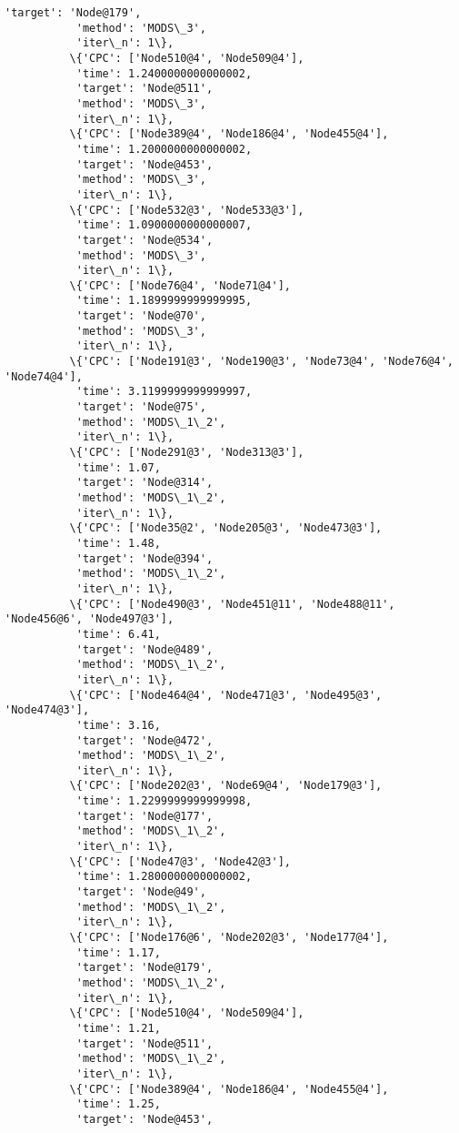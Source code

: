 \documentclass[11pt]{article}
\begin{document}
\begin{Verbatim}[commandchars=\\\{\}]
           'target': 'Node@179',
           'method': 'MODS\_3',
           'iter\_n': 1\},
          \{'CPC': ['Node510@4', 'Node509@4'],
           'time': 1.2400000000000002,
           'target': 'Node@511',
           'method': 'MODS\_3',
           'iter\_n': 1\},
          \{'CPC': ['Node389@4', 'Node186@4', 'Node455@4'],
           'time': 1.2000000000000002,
           'target': 'Node@453',
           'method': 'MODS\_3',
           'iter\_n': 1\},
          \{'CPC': ['Node532@3', 'Node533@3'],
           'time': 1.0900000000000007,
           'target': 'Node@534',
           'method': 'MODS\_3',
           'iter\_n': 1\},
          \{'CPC': ['Node76@4', 'Node71@4'],
           'time': 1.1899999999999995,
           'target': 'Node@70',
           'method': 'MODS\_3',
           'iter\_n': 1\},
          \{'CPC': ['Node191@3', 'Node190@3', 'Node73@4', 'Node76@4', 'Node74@4'],
           'time': 3.1199999999999997,
           'target': 'Node@75',
           'method': 'MODS\_1\_2',
           'iter\_n': 1\},
          \{'CPC': ['Node291@3', 'Node313@3'],
           'time': 1.07,
           'target': 'Node@314',
           'method': 'MODS\_1\_2',
           'iter\_n': 1\},
          \{'CPC': ['Node35@2', 'Node205@3', 'Node473@3'],
           'time': 1.48,
           'target': 'Node@394',
           'method': 'MODS\_1\_2',
           'iter\_n': 1\},
          \{'CPC': ['Node490@3', 'Node451@11', 'Node488@11', 'Node456@6', 'Node497@3'],
           'time': 6.41,
           'target': 'Node@489',
           'method': 'MODS\_1\_2',
           'iter\_n': 1\},
          \{'CPC': ['Node464@4', 'Node471@3', 'Node495@3', 'Node474@3'],
           'time': 3.16,
           'target': 'Node@472',
           'method': 'MODS\_1\_2',
           'iter\_n': 1\},
          \{'CPC': ['Node202@3', 'Node69@4', 'Node179@3'],
           'time': 1.2299999999999998,
           'target': 'Node@177',
           'method': 'MODS\_1\_2',
           'iter\_n': 1\},
          \{'CPC': ['Node47@3', 'Node42@3'],
           'time': 1.2800000000000002,
           'target': 'Node@49',
           'method': 'MODS\_1\_2',
           'iter\_n': 1\},
          \{'CPC': ['Node176@6', 'Node202@3', 'Node177@4'],
           'time': 1.17,
           'target': 'Node@179',
           'method': 'MODS\_1\_2',
           'iter\_n': 1\},
          \{'CPC': ['Node510@4', 'Node509@4'],
           'time': 1.21,
           'target': 'Node@511',
           'method': 'MODS\_1\_2',
           'iter\_n': 1\},
          \{'CPC': ['Node389@4', 'Node186@4', 'Node455@4'],
           'time': 1.25,
           'target': 'Node@453',

\end{Verbatim}
\end{document}
